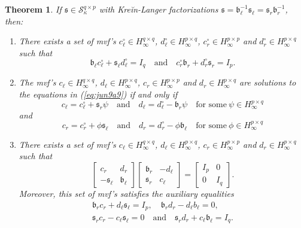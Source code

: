 \documentclass[12pt,twoside,a4paper]{amsart}
\newtheorem{thm}{Theorem}[section]
\theoremstyle{definition}
\numberwithin{equation}{section}
\begin{document}
\begin{thm}
\label{thm:jun1a8}
If ${{\mathfrak s}}\in{\mathcal S}^{q\times p}_\kappa$ with Kre\u{i}n-Langer factorizations
${{\mathfrak s}}={{\mathfrak b}}_\ell^{-1}{{\mathfrak s}}_\ell={{\mathfrak s}}_r{{\mathfrak b}}_r^{-1}$, then:
\begin{enumerate}
\item[\rm(1)] There exists a set of mvf's
$c_\ell^\circ\in H_\infty^{q\times q}$, $d_\ell^\circ\in H_\infty^{p\times q}$,
$c_r^\circ\in H_\infty^{p\times p}$ and $d_r^\circ\in H_\infty^{p\times q}$ such that
\begin{equation}
\label{eq:jun9a9}
{{\mathfrak b}}_\ell c_\ell^\circ+{{\mathfrak s}}_\ell d_\ell^\circ=I_q\quad\text{and}\quad
c_r^\circ {{\mathfrak b}}_r+d_r^\circ {{\mathfrak s}}_r=I_p.
\end{equation}
\item[\rm(2)] The mvf's $c_\ell\in H_\infty^{q\times q}$,
$d_\ell\in H_\infty^{p\times q}$,
$c_r\in H_\infty^{p\times p}$ and $d_r\in H_\infty^{p\times q}$ are solutions to the
equations in (\ref{eq:jun9a9}) if and only if
\begin{equation}
\label{eq:jun9b9}
c_\ell =c_\ell^\circ+{{\mathfrak s}}_r\psi\quad\text{and}\quad
d_\ell =d_\ell^\circ-{{\mathfrak b}}_r\psi\quad\textrm{for some}\ \psi\in H_\infty^{p\times q}
\end{equation}
and
\begin{equation}
\label{eq:jun9c9}
c_r=c_r^\circ +\phi{{\mathfrak s}}_\ell\quad\text{and}\quad d_r=d_r^\circ -\phi {{\mathfrak b}}_\ell
\quad\textrm{for some}\ \phi\in H_\infty^{p\times q}
\end{equation}
\item[\rm(3)] There exists a set of mvf's
$c_\ell\in H_\infty^{q\times q}$, $d_\ell\in H_\infty^{p\times q}$,
$c_r\in H_\infty^{p\times p}$ and $d_r\in H_\infty^{p\times q}$ such that
\begin{equation}
\label{eq:jun1a8}
\begin{bmatrix}c_r&d_r\\-{{\mathfrak s}}_\ell&{{\mathfrak b}}_\ell\end{bmatrix}
\begin{bmatrix}{{\mathfrak b}}_r&-d_\ell\\ {{\mathfrak s}}_r&c_\ell\end{bmatrix}=\begin{bmatrix}I_p&0\\
0&I_q\end{bmatrix}.
\end{equation}
Moreover, this set of mvf's satisfies the auxiliary equalities
\begin{eqnarray}
\label{eq:jun1b8}
{{\mathfrak b}}_rc_r+d_\ell {{\mathfrak s}}_\ell=I_p,\quad {{\mathfrak b}}_rd_r-d_\ell b_\ell =0,\\
{{\mathfrak s}}_rc_r-c_\ell {{\mathfrak s}}_\ell=0\quad\text{and}\quad {{\mathfrak s}}_rd_r+c_\ell {{\mathfrak b}}_\ell=I_q .
\label{eq:jun1c8}
\end{eqnarray}
\end{enumerate}
\end{thm}
\end{document}

